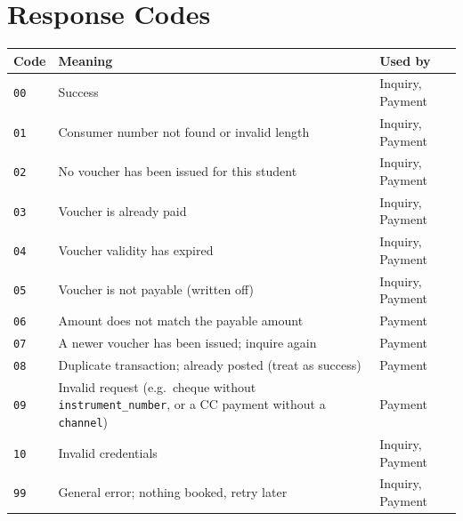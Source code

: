 \documentclass[11pt]{article}
\begin{document}
\section{Response Codes}
\begin{center}
\begin{tabularx}{\textwidth}{@{}l L l@{}}
\toprule
\textbf{Code} & \textbf{Meaning} & \textbf{Used by} \\
\midrule
\texttt{00} & Success & Inquiry, Payment \\
\texttt{01} & Consumer number not found or invalid length & Inquiry, Payment \\
\texttt{02} & No voucher has been issued for this student & Inquiry, Payment \\
\texttt{03} & Voucher is already paid & Inquiry, Payment \\
\texttt{04} & Voucher validity has expired & Inquiry, Payment \\
\texttt{05} & Voucher is not payable (written off) & Inquiry, Payment \\
\texttt{06} & Amount does not match the payable amount & Payment \\
\texttt{07} & A newer voucher has been issued; inquire again & Payment \\
\texttt{08} & Duplicate transaction; already posted (treat as success) & Payment \\
\texttt{09} & Invalid request (e.g.\ cheque without \texttt{instrument\_number}, or a CC payment without a \texttt{channel}) & Payment \\
\texttt{10} & Invalid credentials & Inquiry, Payment \\
\texttt{99} & General error; nothing booked, retry later & Inquiry, Payment \\
\bottomrule
\end{tabularx}
\end{center}
\end{document}
